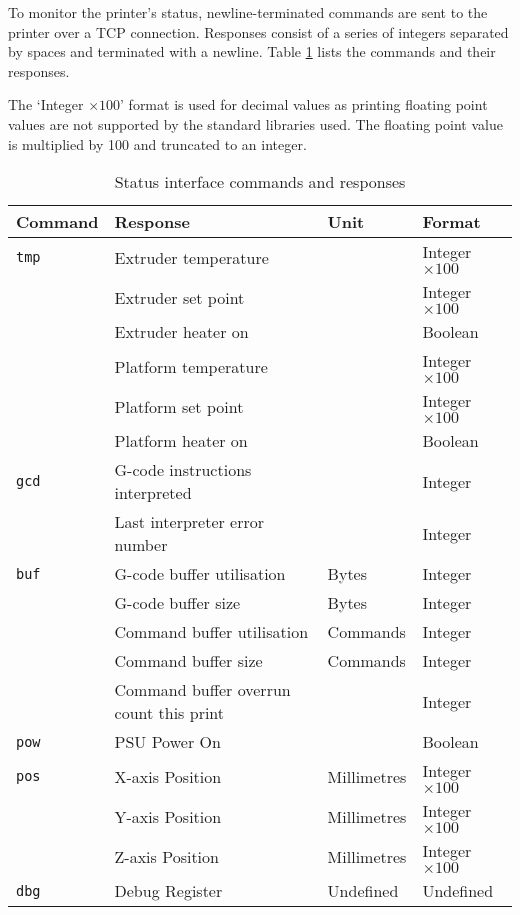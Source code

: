 		\label{sec:statusSpec}
		
		To monitor the printer's status, newline-terminated commands are sent to the
		printer over a TCP connection. Responses consist of a series of integers
		separated by spaces and terminated with a newline. Table
		\ref{tab:statuscmds} lists the commands and their responses.
		
		The `Integer $\times100$' format is used for decimal values as printing
		floating point values are not supported by the standard libraries used. The
		floating point value is multiplied by 100 and truncated to an integer.
		
		\begin{table}
			\centering
			\begin{tabular}{l l l l}
				\toprule
				Command & Response & Unit & Format \\
				\midrule
				\verb|tmp| & Extruder temperature & \dC & Integer $\times100$ \\
				           & Extruder set point   & \dC & Integer $\times100$ \\
				           & Extruder heater on   &     & Boolean \\
				           & Platform temperature & \dC & Integer $\times100$ \\
				           & Platform set point   & \dC & Integer $\times100$ \\
				           & Platform heater on   &     & Boolean \\
				\addlinespace
				\verb|gcd| & G-code instructions interpreted & & Integer \\
				           & Last interpreter error number &  & Integer \\
				\addlinespace
				\verb|buf| & G-code buffer utilisation & Bytes & Integer \\
				           & G-code buffer size & Bytes & Integer \\
				           & Command buffer utilisation & Commands & Integer \\
				           & Command buffer size & Commands & Integer \\
				           & Command buffer overrun count this print & & Integer \\
				\addlinespace
				\verb|pow| & PSU Power On & & Boolean \\
				\addlinespace
				\verb|pos| & X-axis Position & Millimetres & Integer $\times100$ \\
				           & Y-axis Position & Millimetres & Integer $\times100$ \\
				           & Z-axis Position & Millimetres & Integer $\times100$ \\
				\addlinespace
				\verb|dbg| & Debug Register & Undefined & Undefined \\
				\bottomrule
			\end{tabular}
			
			\caption{Status interface commands and responses}
			\label{tab:statuscmds}
		\end{table}
